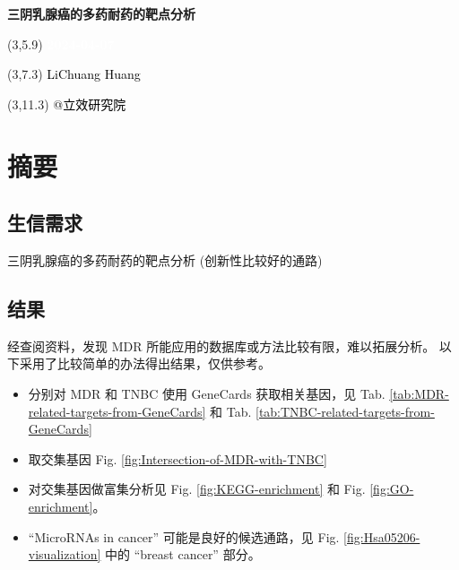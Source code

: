 \documentclass[
]{article}
\author{}
\date{\vspace{-2.5em}}
\providecommand{\tightlist}{%
  \setlength{\itemsep}{0pt}\setlength{\parskip}{0pt}}
\begin{document}
\begin{titlepage} 
\begin{center} \textbf{\Huge
三阴乳腺癌的多药耐药的靶点分析} \vspace{4em}
\begin{textblock}{10}(3,5.9) \huge
\textbf{\textcolor{white}{2024-04-07}}
\end{textblock} \begin{textblock}{10}(3,7.3)
\Large \textcolor{black}{LiChuang Huang}
\end{textblock} \begin{textblock}{10}(3,11.3)
\Large \textcolor{black}{@立效研究院}
\end{textblock} \end{center} \end{titlepage}
\restoregeometry


\tableofcontents

\listoffigures

\listoftables

\newpage


\hypertarget{abstract}{%
\section{摘要}\label{abstract}}

\hypertarget{ux751fux4fe1ux9700ux6c42}{%
\subsection{生信需求}\label{ux751fux4fe1ux9700ux6c42}}

三阴乳腺癌的多药耐药的靶点分析 (创新性比较好的通路)

\hypertarget{ux7ed3ux679c}{%
\subsection{结果}\label{ux7ed3ux679c}}

经查阅资料，发现 MDR 所能应用的数据库或方法比较有限，难以拓展分析。
以下采用了比较简单的办法得出结果，仅供参考。

\begin{itemize}
\tightlist
\item
  分别对 MDR 和 TNBC 使用 GeneCards 获取相关基因，见
  Tab. \ref{tab:MDR-related-targets-from-GeneCards} 和
  Tab. \ref{tab:TNBC-related-targets-from-GeneCards}
\item
  取交集基因 Fig. \ref{fig:Intersection-of-MDR-with-TNBC}
\item
  对交集基因做富集分析见 Fig. \ref{fig:KEGG-enrichment} 和 Fig. \ref{fig:GO-enrichment}。
\item
  ``MicroRNAs in cancer'' 可能是良好的候选通路，见 Fig. \ref{fig:Hsa05206-visualization} 中的 ``breast cancer'' 部分。
\end{itemize}
\end{document}
